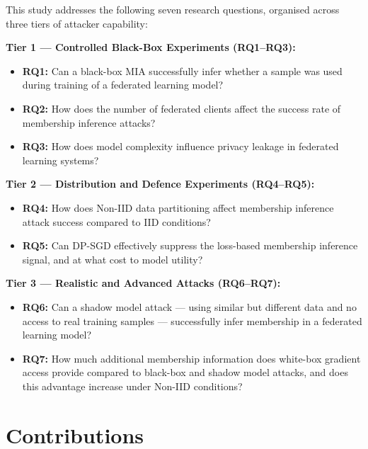 \documentclass[12pt, a4paper]{report}
\begin{document}
This study addresses the following seven research questions, organised across
three tiers of attacker capability:

\noindent\textbf{Tier 1 --- Controlled Black-Box Experiments (RQ1--RQ3):}
\begin{itemize}[leftmargin=1.5em, itemsep=4pt]
  \item \textbf{RQ1:} Can a black-box MIA successfully infer whether a sample
        was used during training of a federated learning model?
  \item \textbf{RQ2:} How does the number of federated clients affect the success
        rate of membership inference attacks?
  \item \textbf{RQ3:} How does model complexity influence privacy leakage in
        federated learning systems?
\end{itemize}

\noindent\textbf{Tier 2 --- Distribution and Defence Experiments (RQ4--RQ5):}
\begin{itemize}[leftmargin=1.5em, itemsep=4pt]
  \item \textbf{RQ4:} How does Non-IID data partitioning affect membership
        inference attack success compared to IID conditions?
  \item \textbf{RQ5:} Can DP-SGD effectively suppress the loss-based membership
        inference signal, and at what cost to model utility?
\end{itemize}

\noindent\textbf{Tier 3 --- Realistic and Advanced Attacks (RQ6--RQ7):}
\begin{itemize}[leftmargin=1.5em, itemsep=4pt]
  \item \textbf{RQ6:} Can a shadow model attack --- using similar but different
        data and no access to real training samples --- successfully infer
        membership in a federated learning model?
  \item \textbf{RQ7:} How much additional membership information does white-box
        gradient access provide compared to black-box and shadow model attacks,
        and does this advantage increase under Non-IID conditions?
\end{itemize}

\section{Contributions}
\end{document}
